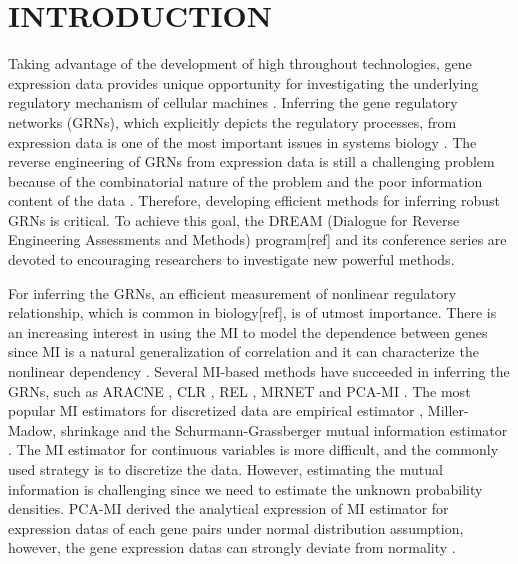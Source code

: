 \documentclass{bioinfo}
\begin{document}
\section{INTRODUCTION}

Taking advantage of the development of high throughout technologies,
gene expression data provides unique opportunity for investigating
the underlying regulatory mechanism of cellular machines
\citep{hughes2000functional}. Inferring the gene regulatory networks
(GRNs), which explicitly depicts the regulatory processes, from
expression data is one of the most important issues in systems
biology \citep{basso2005reverse}. The reverse engineering of GRNs
from expression data is still a challenging problem because of the
combinatorial nature of the problem and the poor information content
of the data \citep{margolin2006reverse}. Therefore, developing
efficient methods for inferring robust GRNs is critical. To achieve
this goal, the DREAM (Dialogue for Reverse Engineering Assessments
and Methods) program[ref] and its conference series are devoted to
encouraging researchers to investigate new powerful methods.

For inferring the GRNs, an efficient measurement of nonlinear
regulatory relationship, which is common in biology[ref], is of
utmost importance. There is an increasing interest in using the MI
to model the dependence between genes since MI is a natural
generalization of correlation and it can characterize the nonlinear
dependency \citep{brunel2010miss,cover2006elements}.  Several
MI-based methods have succeeded in inferring the GRNs, such as
ARACNE \citep{margolin2006aracne}, CLR \citep{faith2007large}, REL
\citep{butte2000mutual} , MRNET \citep{meyer2008minet}  and PCA-MI
\citep{zhang2012inferring}. The most popular MI estimators for
discretized data are empirical estimator
\citep{paninski2003estimation},
Miller-Madow\citep{paninski2003estimation}, shrinkage
\citep{schafer2005shrinkage} and the Schurmann-Grassberger mutual
information estimator  \citep{schurmann2002entropy}. The MI
estimator for continuous variables is more difficult, and the
commonly used strategy is to discretize the
data\citep{de2012bagging}. However, estimating the mutual
information is challenging since we need to estimate the unknown
probability densities. PCA-MI \citep{zhang2012inferring} derived the
analytical expression of MI estimator for expression datas of each
gene pairs under normal distribution assumption, however,  the gene
expression datas can strongly deviate from normality
\citep{emmert2010local}.
\end{document}
